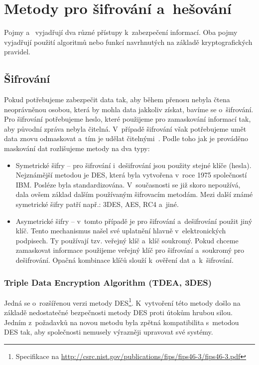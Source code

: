 \chapter{Metody pro šifrování a~hešování}
\label{ch:sifrovani}
Pojmy  a~ vyjadřují dva různé přístupy k~zabezpečení informací. Oba pojmy
vyjadřují použití algoritmů nebo funkcí navrhnutých na základě kryptografických pravidel. 
\section{Šifrování}
Pokud potřebujeme zabezpečit data tak, aby během přenosu nebyla čtena neoprávněnou osobou, která by
mohla data jakkoliv získat, bavíme se o~šifrování. Pro šifrování potřebujeme heslo, které použijeme
pro zamaskování informací tak, aby původní zpráva nebyla čitelná. V~případě šifrování však
potřebujeme umět data znovu odmaskovat a~tím je udělat čitelnými~\cite{AC:1996}. Podle toho
jak je prováděno maskování dat rozlišujeme metody na dva typy:
\begin{itemize}
    \item Symetrické šifry -- pro šifrování i~dešifrování jsou použity stejné klíče (hesla).
        Nejznámější metodou je DES, která byla vytvořena v~roce 1975 společností IBM. Posléze
	byla standardizována. V~současnosti se již skoro nepoužívá, dala ovšem základ dalším
        používaným šifrovacím metodám. Mezi další známé symetrické šifry patří např.: 3DES, AES,
	RC4 a~jiné.
    \item Asymetrické šifry -- v~tomto případě je pro šifrování a~dešifrování použit jiný klíč.
        Tento mechanismus našel své uplatnění hlavně v~elektronických podpisech. Ty používají tzv.
        veřejný klíč a~klíč soukromý. Pokud chceme zamaskovat informace použijeme veřejný klíč pro
        šifrování a~soukromý pro dešifrování. Opačná kombinace klíčů slouží k~ověření dat a~k~šifrování.
\end{itemize}

\subsection{Triple Data Encryption Algorithm (TDEA, 3DES)}
Jedná se o~rozšířenou verzi metody
DES\footnote{Specifikace na \url{http://csrc.nist.gov/publications/fips/fips46-3/fips46-3.pdf}}.
K~vytvoření této metody došlo na základě nedostatečné bezpečnosti metody DES proti útokům hrubou
silou. Jedním z~požadavků na novou metodu byla zpětná kompatibilita s~metodou DES tak, aby
společnosti nemusely výrazněji upravovat své systémy.

